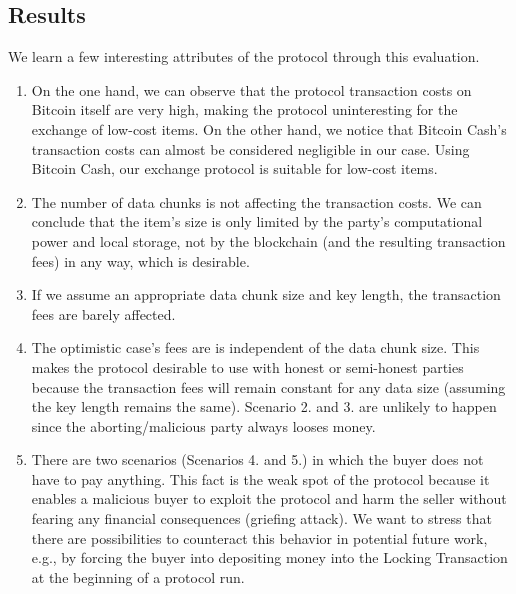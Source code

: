 \documentclass{cacthesis}
\newcounter{protocol}
\begin{document}
	    \subsection{Results}
	    \label{sub:Results}
	    We learn a few interesting attributes of the protocol through this evaluation.
	    
        \begin{enumerate}
        
        \item On the one hand, we can observe that the protocol transaction costs on Bitcoin itself are very high, making the protocol uninteresting for the exchange of low-cost items. On the other hand, we notice that Bitcoin Cash's transaction costs can almost be considered negligible in our case. Using Bitcoin Cash, our exchange protocol is suitable for low-cost items.
        
        \item The number of data chunks is not affecting the transaction costs. We can conclude that the item's size is only limited by the party's computational power and local storage, not by the blockchain (and the resulting transaction fees) in any way, which is desirable.
        
        \item If we assume an appropriate data chunk size and key length, the transaction fees are barely affected. 
        
        \item The optimistic case's fees are is independent of the data chunk size. This makes the protocol desirable to use with honest or semi-honest parties because the transaction fees will remain constant for any data size (assuming the key length remains the same). Scenario 2. and 3. are unlikely to happen since the aborting/malicious party always looses money.
                    
         \item There are two scenarios (Scenarios 4. and 5.) in which the buyer does not have to pay anything. This fact is the weak spot of the protocol because it enables a malicious buyer to exploit the protocol and harm the seller without fearing any financial consequences (griefing attack). We want to stress that there are possibilities to counteract this behavior in potential future work, e.g., by forcing the buyer into depositing money into the Locking Transaction at the beginning of a protocol run.
         
        \end{enumerate}
	    
\end{document}
